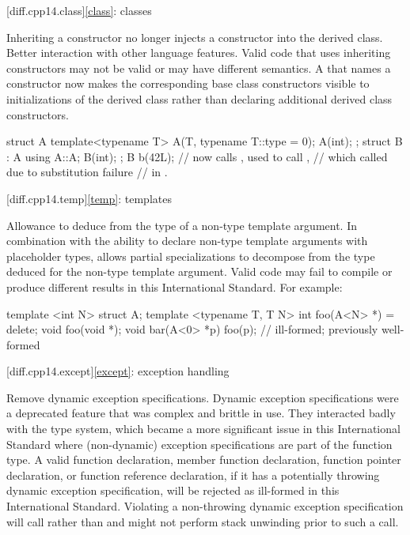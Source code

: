 [diff.cpp14.class]{\ref{class}: classes}

\change
Inheriting a constructor no longer injects a constructor into the derived class.
\rationale
Better interaction with other language features.
\effect
Valid \CppXIV{} code that uses inheriting constructors may not be valid
or may have different semantics. A 
that names a constructor now makes the corresponding base class constructors
visible to initializations of the derived class
rather than declaring additional derived class constructors.
\begin{codeblock}
struct A {
  template<typename T> A(T, typename T::type = 0);
  A(int);
};
struct B : A {
  using A::A;
  B(int);
};
B b(42L);           // now calls , used to call ,
                    // which called  due to substitution failure
                    // in .
\end{codeblock}

[diff.cpp14.temp]{\ref{temp}: templates}

\change
Allowance to deduce from the type of a non-type template argument.
\rationale
In combination with the ability to declare
non-type template arguments with placeholder types,
allows partial specializations to decompose
from the type deduced for the non-type template argument.
\effect
Valid \CppXIV{} code may fail to compile
or produce different results in this International Standard.
For example:
\begin{codeblock}
template <int N> struct A;
template <typename T, T N> int foo(A<N> *) = delete;
void foo(void *);
void bar(A<0> *p) {
  foo(p);           // ill-formed; previously well-formed
}
\end{codeblock}

[diff.cpp14.except]{\ref{except}: exception handling}

\change
Remove dynamic exception specifications.
\rationale
Dynamic exception specifications were a deprecated feature
that was complex and brittle in use.
They interacted badly with the type system,
which became a more significant issue in this International Standard
where (non-dynamic) exception specifications are part of the function type.
\effect
A valid \CppXIV{} function declaration,
member function declaration,
function pointer declaration,
or function reference declaration,
if it has a potentially throwing dynamic exception specification,
will be rejected as ill-formed in this International Standard.
Violating a non-throwing dynamic exception specification
will call 
rather than 
and might not perform stack unwinding prior to such a call.

